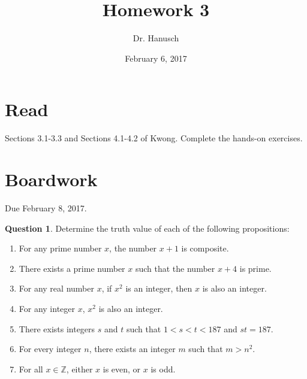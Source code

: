 \documentclass[12pt]{article}
\title{Homework 3}
\author{Dr. Hanusch}  %
\date{February 6, 2017}
\begin{document}
\newtheorem{thm}{Theorem}[section]
\newtheorem{cor}[thm]{Corollary}
\newtheorem{lem}[thm]{Lemma}
\newtheorem{prop}[thm]{Proposition}
\theoremstyle{definition}
\newtheorem{defn}[thm]{Definition}
\newtheorem{qu}[]{Question}
\theoremstyle{remark}
\newtheorem{rem}[thm]{Remark}
\newtheorem*{prf}{Proof}

\newcommand{\norm}[1]{\left\Vert#1\right\Vert}
\newcommand{\abs}[1]{\left\vert#1\right\vert}
\newcommand{\set}[1]{\left\{#1\right\}}
\newcommand{\Real}{\mathbb R}
\newcommand{\eps}{\varepsilon}
\newcommand{\To}{\longrightarrow}
\newcommand{\BX}{\mathbf{B}(X)}
\newcommand{\A}{\mathcal{A}}



\maketitle

\section{Read}

Sections 3.1-3.3 and Sections 4.1-4.2 of Kwong. Complete the hands-on exercises.

\section{Boardwork}

Due February 8, 2017.

\begin{qu} Determine the truth value of each of the following propositions:
\begin{enumerate}[label=\alph*)]
\item For any prime number $x$, the number $x+1$ is composite.
\item There exists a prime number $x$ such that the number $x+4$ is prime.
\item For any real number $x$, if $x^2$ is an integer, then $x$ is also an integer.
\item For any integer $x$, $x^2$ is also an integer.
\item There exists integers $s$ and $t$ such that $1<s<t<187$ and $st=187$.
\item For every integer $n$, there exists an integer $m$ such that $m>n^2$.
\item For all $x \in \mathbb{Z}$, either $x$ is even, or $x$ is odd.
\end{enumerate}
\end{qu}
\end{document}
